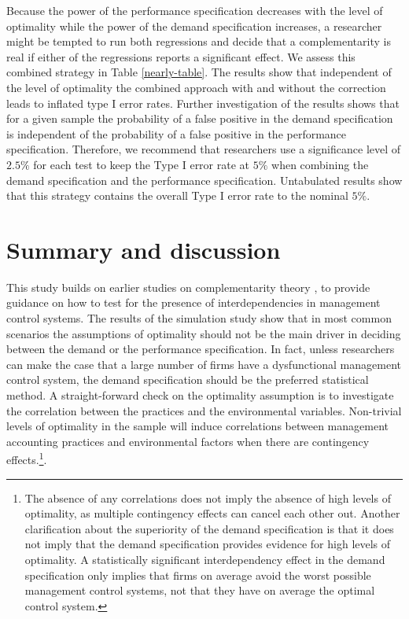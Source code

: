 \documentclass[12pt]{article}
\begin{document}
Because the power of the performance specification decreases with the level of optimality while the power of the demand specification increases, a researcher might be tempted to run both regressions and decide that a complementarity is real if either of the regressions reports a significant effect. We assess this combined strategy in Table \ref{nearly-table}. The results show that independent of the level of optimality the combined approach with and without the correction leads to inflated type I error rates. Further investigation of the results shows that for a given sample the probability of a false positive in the demand specification is independent of the probability of a false positive in the performance specification.  Therefore, we recommend that researchers use a significance level of $2.5\%$ for each test to keep the Type I error rate at $5\%$ when combining the demand specification and the performance specification. Untabulated results show that this strategy contains the overall Type I error rate to the nominal $5\%$.

\section{Summary and discussion}\label{summary-and-discussion}

This study builds on earlier studies on complementarity theory \citep{milgrom_complementarities_1995, grabner_management_2013}, to provide guidance on how to test for the presence of interdependencies in management control systems. The results of the simulation study show that in most common scenarios the assumptions of optimality should not be the main driver in deciding between the demand or the performance specification. In fact, unless researchers can make the case that a large number of firms have a dysfunctional management control system, the demand specification should be the preferred statistical method. A straight-forward check on the optimality assumption is to investigate the correlation between the practices and the environmental variables. Non-trivial levels of optimality in the sample will induce correlations between management accounting practices and environmental factors when there are contingency effects.\footnote{The absence of any correlations does not imply the absence of high levels of optimality, as multiple contingency effects can cancel each other out. Another clarification about the superiority of the demand specification is that it does not imply that the demand specification provides evidence for high levels of optimality. A statistically significant interdependency effect in the demand specification only implies that firms on average avoid the worst possible management control systems, not that they have on average the optimal control system.}.
\end{document}
